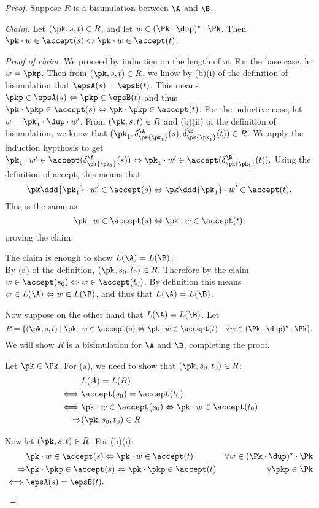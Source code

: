 \soundcompletenaive*
\begin{proof}
Suppose $R$ is a bisimulation between $\A$ and $\B$.

\emph{Claim.} Let $(\pk, s, t)\in R$, and let $w\in  (\Pk\cdot\dup)^\star\cdot\Pk$.
Then $\pk\cdot w\in\accept(s) \Leftrightarrow \pk\cdot w\in\accept(t)$.

\emph{Proof of claim.} We proceed by induction on the length of $w$. For the base
case, let $w = \pkp$. Then from $(\pk, s, t)\in R$, we know by (b)(i) of
the definition of bisimulation that $\epsA(s) = \epsB(t)$. This means
$\pkp\in\epsA(s)\Leftrightarrow\pkp\in\epsB(t)$ and thus $\pk\cdot\pkp\in\accept(s)\Leftrightarrow
\pk\cdot\pkp\in\accept(t)$. For the inductive case, let $w = \pk_1\cdot\dup\cdot w'$. From
$(\pk, s, t)\in R$ and (b)(ii) of the definition of bisimulation, we know that
$(\pk_1, \delta_{\pk{\pk_1}}^{\A}(s), \delta_{\pk{\pk_1}}^{\B}(t))\in R$. We
apply the induction hypthosis to get
$\pk_1\cdot w'\in\accept(\delta_{\pk{\pk_1}}^{\A}(s))\Leftrightarrow \pk_1\cdot w'\in\accept(\delta_{\pk{\pk_1}}^{\B}(t)).$
Using the definition of accept, this means that
\[\pk\ddd{\pk_1}\cdot w'\in\accept(s)\Leftrightarrow \pk\ddd{\pk_1}\cdot w'\in\accept(t).\]
This is the same as
\[\pk\cdot w\in\accept(s) \Leftrightarrow \pk\cdot w\in\accept(t),\]
proving the claim.

The claim is enough to show $L(\A) = L(\B)$:\\
By (a) of the definition, $(\pk, s_0, t_0)\in R$.
Therefore by the claim $w\in \accept(s_0) \Leftrightarrow w\in\accept(t_0)$. By definition
this means $w\in L(\A) \Leftrightarrow w\in L(\B)$, and thus that $L(\A) = L(\B)$.

Now suppose on the other hand that $L(\A) = L(\B)$. Let
\[ R = \{ (\pk, s, t)\mid \pk\cdot w\in\accept(s)\Leftrightarrow\pk\cdot w\in\accept(t) \quad\forall w\in(\Pk\cdot\dup)^\star\cdot\Pk \}.\]
We will show $R$ is a bisimulation for $\A$ and $\B$, completing the proof.

Let $\pk\in\Pk$. For (a), we need to show that $(\pk, s_0, t_0) \in R$:
\begin{align*}
      & L(A) = L(B) \\
\iff  & \accept(s_0) = \accept(t_0) \\
\iff & \pk\cdot w\in\accept(s_0) \Leftrightarrow \pk\cdot w\in\accept(t_0)\\
\Rightarrow & (\pk, s_0, t_0) \in R
\end{align*}

Now let $(\pk, s, t)\in R$.
For (b)(i):
\begin{align*}
            & \pk\cdot w \in\accept(s) \Leftrightarrow \pk\cdot w\in\accept(t) &\forall w\in(\Pk\cdot\dup)^\star\cdot\Pk\\
\Rightarrow & \pk\cdot\pkp \in\accept(s) \Leftrightarrow \pk\cdot\pkp\in\accept(t) &\forall \pkp\in\Pk\\
\iff        & \epsA(s) = \epsB(t).
\end{align*}


\end{proof}
